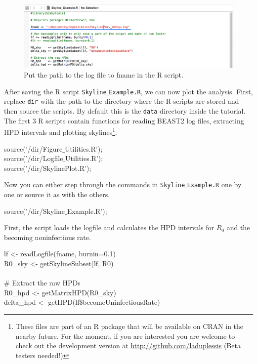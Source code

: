 \documentclass[11pt]{article}
\begin{document}
\begin{figure}[h!]
\centering
\includegraphics[width=\textwidth]{figures/find_log_file.png}
\caption{\small Put the path to the log file to fname in the R script.}
\label{fig:r_script}
\end{figure}

After saving the R script \texttt{Skyline$\_$Example.R}, we can now plot the analysis.
First, replace \texttt{dir} with the path to the directory where the R scripts are stored and then source the scripts. By default this is the \texttt{data} directory inside the tutorial. The first 3 R scripts contain functions for reading BEAST2 log files, extracting HPD intervals and plotting skylines\footnote{These files are part of an R package that will be available on CRAN in the nearby future. For the moment, if you are interested you are welcome to check out the development version at \url{http://github.com/laduplessis}  (Beta testers needed!)}.


\begin{framed}
source('/dir/Figure$\_$Utilities.R');\\
source('/dir/Logfile$\_$Utilities.R');\\
source('/dir/SkylinePlot.R');
\end{framed}

Now you can either step through the commands in \texttt{Skyline$\_$Example.R} one by one or source it as with the others. 

\begin{framed}
source('/dir/Skyline$\_$Example.R');
\end{framed}

First, the script loads the logfile and calculates the HPD intervals for $R_0$ and the becoming noninfectious rate. 

\begin{framed}
lf     <- readLogfile(fname, burnin=0.1) \\
R0\_sky <- getSkylineSubset(lf, \"R0\") \\
 \\
\# Extract the raw HPDs \\
R0\_hpd    <- getMatrixHPD(R0\_sky) \\
delta\_hpd <- getHPD(lf\$becomeUninfectiousRate) 
\end{framed}
\end{document}
